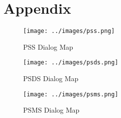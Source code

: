 \section{Appendix}

\begin{figure}[ht]
    \texttt{[image: ../images/pss.png]}
    \caption{PSS Dialog Map}
    \label{fig:pss}
\end{figure}

\begin{figure}[ht]
    \centering
    \texttt{[image: ../images/psds.png]}
    \caption{PSDS Dialog Map}
    \label{fig:psds}
\end{figure}

\begin{figure}[ht]
    \centering
    \texttt{[image: ../images/psms.png]}
    \caption{PSMS Dialog Map}
    \label{fig:psms}
\end{figure}
